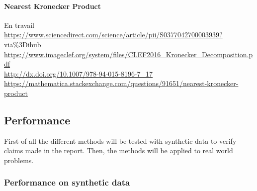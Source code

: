 \documentclass{article}
\theoremstyle{definition}
\begin{document}
\paragraph{Nearest Kronecker Product}
En travail\\
\url{https://www.sciencedirect.com/science/article/pii/S0377042700003939?via\%3Dihub}\\
\url{https://www.imageclef.org/system/files/CLEF2016_Kronecker_Decomposition.pdf}\\
\url{http://dx.doi.org/10.1007/978-94-015-8196-7_17}\\
\url{https://mathematica.stackexchange.com/questions/91651/nearest-kronecker-product}\\
	

\subsection{Performance}
First of all the different methods will be tested with synthetic data to verify claims made in the report. Then, the methods will be applied to real world problems. 
\subsubsection{Performance on synthetic data}
\end{document}
